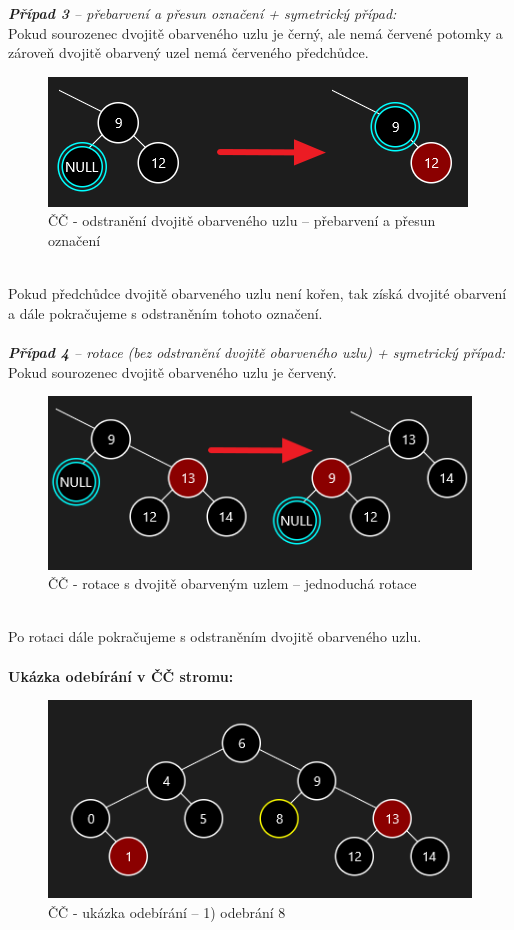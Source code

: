 \documentclass[
  biblatex=false,
  font=serif,
  glossaries=false,
  tables=false,
  theorems=false,
  index
]{kidiplom}
\begin{document}
\noindent \textit{\textbf{Případ 3} -- přebarvení a přesun označení + symetrický případ:}\\
Pokud sourozenec dvojitě obarveného uzlu je černý, ale nemá červené potomky a zároveň dvojitě obarvený uzel nemá červeného předchůdce.
\begin{figure}[h!]
\centering
	\includegraphics[scale=0.8]{obrazky/28Pripad3.png}
	\caption{ČČ - odstranění dvojitě obarveného uzlu -- přebarvení a přesun označení}
\end{figure}\\
Pokud předchůdce dvojitě obarveného uzlu není kořen, tak získá dvojité obarvení a dále pokračujeme s odstraněním tohoto označení.\\\\

\noindent \textit{\textbf{Případ 4} -- rotace (bez odstranění dvojitě obarveného uzlu) + symetrický případ:}\\
Pokud sourozenec dvojitě obarveného uzlu je červený.
\begin{figure}[h!]
\centering
	\includegraphics[scale=0.8]{obrazky/29Pripad4.png}
	\caption{ČČ - rotace s dvojitě obarveným uzlem -- jednoduchá rotace}
\end{figure}\\
\newpage
\noindent Po rotaci dále pokračujeme s odstraněním dvojitě obarveného uzlu.\\\\

\noindent \textbf{Ukázka odebírání v ČČ stromu:}
\begin{figure}[h!]
\centering
	\includegraphics[scale=0.8]{obrazky/30CCMazani.png}
	\caption{ČČ - ukázka odebírání -- 1) odebrání 8}
\end{figure}
\end{document}
